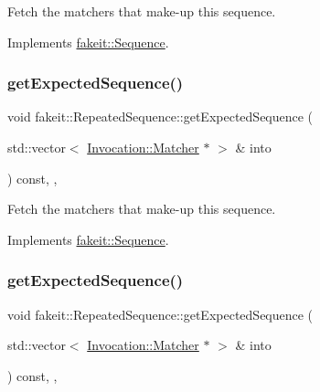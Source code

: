 Fetch the matchers that make-\/up this sequence. 



Implements \mbox{\hyperlink{classfakeit_1_1Sequence_aa1a1e4ad2fcac3379ba38f250bf06884}{fakeit\+::\+Sequence}}.

\mbox{\label{classfakeit_1_1RepeatedSequence_a65b5f62fe0ba9da31b99f28c1a2e53f2}} 
\subsubsection{\texorpdfstring{getExpectedSequence()}{getExpectedSequence()}\hspace{0.1cm}{\footnotesize\ttfamily [8/9]}}
{\footnotesize\ttfamily void fakeit\+::\+Repeated\+Sequence\+::get\+Expected\+Sequence (\begin{DoxyParamCaption}\item[{std\+::vector$<$ \mbox{\hyperlink{structfakeit_1_1Invocation_1_1Matcher}{Invocation\+::\+Matcher}} $\ast$ $>$ \&}]{into }\end{DoxyParamCaption}) const\hspace{0.3cm}{\ttfamily [inline]}, {\ttfamily [override]}, {\ttfamily [virtual]}}



Fetch the matchers that make-\/up this sequence. 



Implements \mbox{\hyperlink{classfakeit_1_1Sequence_aa1a1e4ad2fcac3379ba38f250bf06884}{fakeit\+::\+Sequence}}.

\mbox{\label{classfakeit_1_1RepeatedSequence_a65b5f62fe0ba9da31b99f28c1a2e53f2}} 
\subsubsection{\texorpdfstring{getExpectedSequence()}{getExpectedSequence()}\hspace{0.1cm}{\footnotesize\ttfamily [9/9]}}
{\footnotesize\ttfamily void fakeit\+::\+Repeated\+Sequence\+::get\+Expected\+Sequence (\begin{DoxyParamCaption}\item[{std\+::vector$<$ \mbox{\hyperlink{structfakeit_1_1Invocation_1_1Matcher}{Invocation\+::\+Matcher}} $\ast$ $>$ \&}]{into }\end{DoxyParamCaption}) const\hspace{0.3cm}{\ttfamily [inline]}, {\ttfamily [override]}, {\ttfamily [virtual]}}



